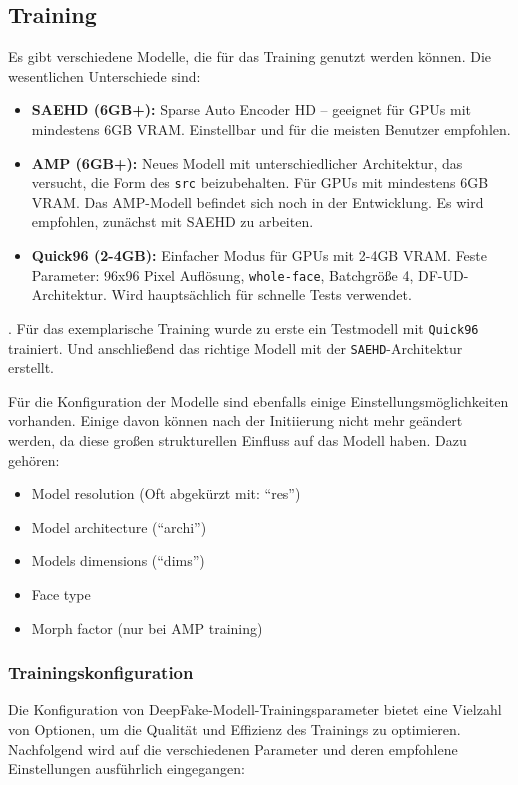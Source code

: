 \subsection*{Training}\label{subsec:training}
Es gibt verschiedene Modelle, die für das Training genutzt werden können.
Die wesentlichen Unterschiede sind:
\begin{itemize}
    \item \textbf{SAEHD (6GB+):} Sparse Auto Encoder HD – geeignet für GPUs mit mindestens 6GB VRAM.
    Einstellbar und für die meisten Benutzer empfohlen.
    \item \textbf{AMP (6GB+):} Neues Modell mit unterschiedlicher Architektur, das versucht, die Form des \texttt{src} beizubehalten.
    Für GPUs mit mindestens 6GB VRAM.
Das AMP-Modell befindet sich noch in der Entwicklung.
    Es wird empfohlen, zunächst mit SAEHD zu arbeiten.
    \item \textbf{Quick96 (2-4GB):} Einfacher Modus für GPUs mit 2-4GB VRAM.
    Feste Parameter: 96x96 Pixel Auflösung, \texttt{whole-face}, Batchgröße 4, DF-UD-Architektur.
    Wird hauptsächlich für schnelle Tests verwendet.
\end{itemize}.
Für das exemplarische Training wurde zu erste ein Testmodell mit \texttt{Quick96} trainiert.
Und anschließend das richtige Modell mit der \texttt{SAEHD}-Architektur erstellt.

Für die Konfiguration der Modelle sind ebenfalls einige Einstellungsmöglichkeiten vorhanden.
Einige davon können nach der Initiierung nicht mehr geändert werden, da diese großen strukturellen Einfluss auf das Modell haben.
Dazu gehören:
\begin{itemize}
    \item Model resolution (Oft abgekürzt mit: ``res'')
    \item Model architecture (``archi'')
    \item Models dimensions (``dims'')
    \item Face type
    \item Morph factor (nur bei AMP training)
\end{itemize}

\subsubsection*{Trainingskonfiguration}
Die Konfiguration von DeepFake-Modell-Trainingsparameter bietet eine Vielzahl von Optionen, um die Qualität und Effizienz des Trainings zu optimieren.
Nachfolgend wird auf die verschiedenen Parameter und deren empfohlene Einstellungen ausführlich eingegangen:

